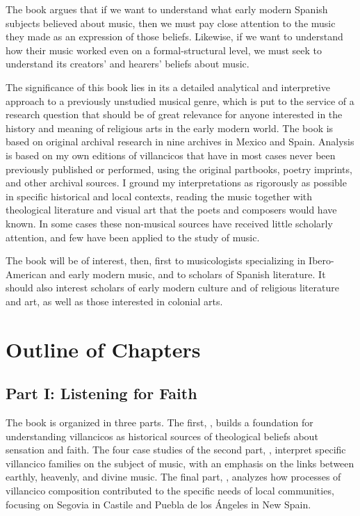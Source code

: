 \documentclass{vcbook-proposal}
\begin{document}
The book argues that if we want to understand what early modern Spanish 
subjects believed about music, then we must pay close attention to the music 
they made as an expression of those beliefs.
Likewise, if we want to understand how their music worked even on a 
formal-structural level, we must seek to understand its creators' and hearers' 
beliefs about music.

The significance of this book lies in its a detailed analytical and 
interpretive approach to a previously unstudied musical genre, which is put to 
the service of a research question that should be of great relevance for anyone 
interested in the history and meaning of religious arts in the early modern 
world.
The book is based on original archival research in nine archives in Mexico and 
Spain.
Analysis is based on my own editions of villancicos that have in most cases 
never been previously published or performed, using the original partbooks, 
poetry imprints, and other archival sources.
I ground my interpretations as rigorously as possible in specific historical 
and local contexts, reading the music together with theological literature and 
visual art that the poets and composers would have known.
In some cases these non-musical sources have received little scholarly 
attention, and few have been applied to the study of music.

The book will be of interest, then, first to musicologists specializing in 
Ibero-American and early modern music, and to scholars of Spanish literature.
It should also interest scholars of early modern culture and of religious 
literature and art, as well as those interested in colonial arts.


\section{Outline of Chapters}

\subsection{Part I: Listening for Faith}

The book is organized in three parts.
The first, , builds a foundation for 
understanding villancicos as historical sources of theological beliefs about 
sensation and faith.
The four case studies of the second part, , interpret specific villancico families on the subject of music, with an 
emphasis on the links between earthly, heavenly, and divine music.
The final part, , analyzes how processes of 
villancico composition contributed to the specific needs of local communities, 
focusing on Segovia in Castile and Puebla de los Ángeles in New Spain.
\end{document}
